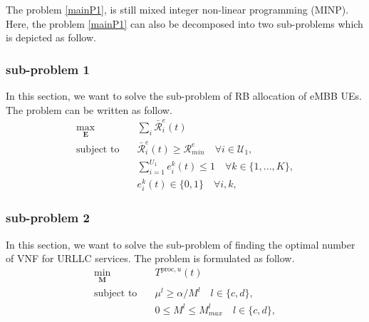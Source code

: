 \documentclass[conference]{IEEEtran}
\begin{document}
The problem \eqref{mainP1}, is still mixed integer non-linear programming (MINP). Here, the problem \eqref{mainP1}
can also be decomposed into two sub-problems which is depicted as follow.
\subsubsection{sub-problem 1}
In this section, we want to solve the sub-problem of RB allocation of eMBB UEs.
The problem can be written as follow.
\begin{subequations} \label{mainP11}
\begin{alignat}{4}
\max\limits_{ \boldsymbol{E} } &  \sum_i \bar{\mathcal{R}}_{i}^e(t)       \ \\
\text{subject to} \quad  & \bar{\mathcal{R}}_{i}^e(t) \geq  \mathcal{R}_{min}^e \quad \forall i \in \mathcal{U}_1, \label{p11} \\
&\sum_{i=1}^{U_1}e^k_i(t)\leq 1 \quad \forall k \in \{1,...,K\},\label{p115} \\
&e^k_i(t)\in \{0,1\}  \quad \forall i,k, \label{p116} 
\end{alignat}
\label{constraints}
\end{subequations}
\subsubsection{sub-problem 2}
In this section, we want to solve the sub-problem of finding the optimal number of VNF for URLLC services.
The problem is formulated as follow.
\begin{subequations} \label{mainP2}
\begin{alignat}{4}
\min\limits_{ \boldsymbol{M} } &  T^{\text{proc}, u}(t)       \ \\
\text{subject to} \quad  & \mu^l \geq \alpha/M^l \quad l \in \{c,d\},\label{p28} \\
& 0 \leq M^l \leq M_{max}^l  \quad l \in \{c,d\},\label{p210}
\end{alignat}
\label{constraints}
\end{subequations}
\end{document}
